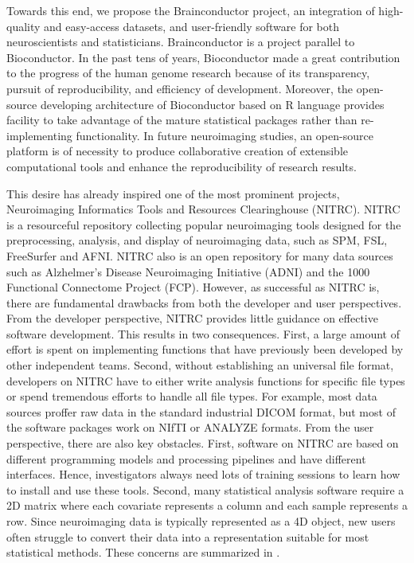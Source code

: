 \documentclass{nature}
\begin{document}
Towards this end, we propose the Brainconductor project, an integration of
high-quality and easy-access datasets, and user-friendly software for both
neuroscientists and statisticians. Brainconductor is a project parallel to
Bioconductor. In the past tens of years,
Bioconductor\cite{gentleman2004bioconductor} made a great contribution to the
progress of
the human genome research because of its transparency, pursuit of
reproducibility, and efficiency of development. Moreover, the open-source
developing architecture of Bioconductor based on R language provides facility to
take advantage of the mature statistical packages rather than re-implementing
functionality. In future neuroimaging studies, an open-source platform is of
necessity to produce collaborative creation of extensible computational tools
and enhance the reproducibility of research results.




This desire has already  %
inspired one of the most prominent projects, Neuroimaging
Informatics Tools and Resources Clearinghouse (NITRC).
NITRC is a resourceful repository collecting popular neuroimaging tools
designed for the preprocessing,
analysis, and display of neuroimaging data, such as
SPM\cite{penny2011statistical}, FSL\cite{jenkinson2012fsl},
FreeSurfer\cite{fischl2012freesurfer} and AFNI\cite{cox1996afni}. NITRC also is
an open repository for many
data sources such as
Alzhelmer's Disease Neuroimaging Initiative (ADNI) and the
1000 Functional Connectome Project (FCP).
However, as successful as NITRC is, there are fundamental
drawbacks from both the developer and user perspectives.
From the developer perspective,
NITRC provides little guidance on effective software
development.
This results in two consequences. First, a large amount of
effort is spent on implementing functions that have
previously been developed by other independent teams. Second,
without establishing an universal file format,
developers on NITRC have to either
write analysis functions for specific file types or spend tremendous
efforts to handle all file types.
For example,
most data sources proffer raw data in the standard industrial DICOM
format, but most of the software packages work on NIfTI or ANALYZE formats.
From the user perspective, there are also key obstacles.
First, software on NITRC are based on different programming models and
processing pipelines and have different interfaces.
Hence, investigators always need lots of training sessions to
learn how to install and use these tools. Second, many statistical
analysis software require a 2D matrix where each covariate
represents a column and each sample represents a row. Since neuroimaging
data is typically represented as a 4D object, new users often
struggle to convert their data into a representation suitable for
most statistical methods. These concerns are summarized in .
\end{document}
